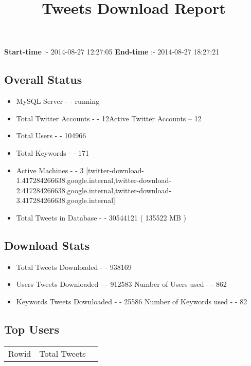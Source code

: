 \documentclass{article}\usepackage[T1]{fontenc}
\begin{document}
\title{\textbf{Tweets Download Report}}
               \date{}
                \maketitle
               \centerline{\textbf{Start-time} :- 2014-08-27 12:27:05 \hspace{40pt} \textbf{End-time} :- 2014-08-27 18:27:21}               \subsection*{Overall Status}                \begin{itemize}                \item MySQL Server - - running               \item Total Twitter Accounts - - 12\newline Active Twitter Accounts -- 12               \item Total Users - - 104966               \item Total Keywords - - 171               \item Active Machines - - 3 [twitter-download-1.417284266638.google.internal,twitter-download-2.417284266638.google.internal,twitter-download-3.417284266638.google.internal]               \item Total Tweets in Database - - 30544121 ( 135522 MB )               \end{itemize}               \subsection*{Download Stats}                \begin{itemize}                \item Total Tweets Downloaded - - 938169               \item Users Tweets Downloaded - - 912583 \newline Number of Users used - - 862               \item Keywords Tweets Downloaded - - 25586 \newline Number of Keywords used - - 82              \end{itemize}              \subsection*{Top Users}\begin{tabular}{|c|c|c|}         \hline         Rowid & Total Tweets \\ 

\end{tabular}
\end{document}
